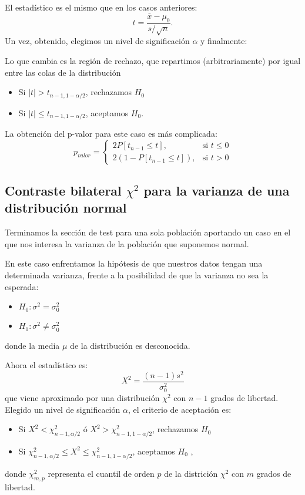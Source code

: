 \documentclass[a4paper,12pt]{article}
\begin{document}
El estadístico es el mismo que en los casos anteriores:
$$t=\frac{\bar{x}-\mu_0}{s/\sqrt{n}}.$$
Un vez, obtenido, elegimos un nivel de significación $\alpha$ y finalmente:

Lo que cambia es la región de rechazo, que repartimos (arbitrariamente) por igual entre las colas de la distribución
\begin{itemize}
	\item Si $|t|>t_{n-1,1-\alpha/2}$, rechazamos $H_0$
	\item Si $|t|\leq t_{n-1,1-\alpha/2}$, aceptamos $H_0$.
\end{itemize}

La obtención del p-valor para este caso es más complicada:
$$p_{valor} = \begin{cases} 2P[t_{n-1}\leq t], & \mbox{si } t\leq 0 \\ 2(1-P[t_{n-1}\leq t]), & \mbox{si } t>0 \end{cases}$$

\subsection{Contraste bilateral $\chi^2$ para la varianza de una distribución normal}

Terminamos la sección de test para una sola población aportando un caso en el que nos interesa la varianza de la población que suponemos normal.

En este caso enfrentamos la hipótesis de que nuestros datos tengan una determinada varianza, frente a la posibilidad  de que la varianza no sea la esperada: 
\begin{itemize}
	\item $H_0:\sigma^2=\sigma^2_0$
	\item $H_1: \sigma^2\neq\sigma^2_0$
\end{itemize}
donde la media $\mu$ de la distribución es desconocida.

Ahora el estadístico es:
    $$X^2=\frac{(n-1)s^2}{\sigma_0^2}$$
que viene aproximado por una distribución $\chi^2$ con $n - 1$ grados de libertad.
Elegido un nivel de significación $\alpha$, el criterio de aceptación es:
\begin{itemize}
	\item Si $X^2<\chi^2_{n-1,\alpha/2}$ ó $X^2>\chi^2_{n-1,1-\alpha/2}$, rechazamos $H_0$
	\item Si $\chi^2_{n-1,\alpha/2}\leq X^2\leq\chi^2_{n-1,1-\alpha/2}$, aceptamos $H_0$
        ,
\end{itemize}
    donde $\chi^2_{m, p}$ representa el cuantil de orden $p$ de la districión $\chi^2$ con $m$ grados de libertad.
\end{document}
